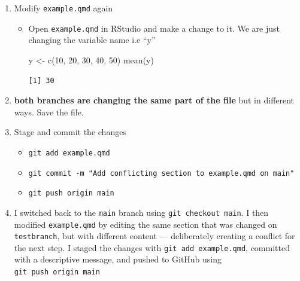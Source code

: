 \documentclass[
  letterpaper,
  DIV=11,
  numbers=noendperiod]{scrartcl}
\newenvironment{Shaded}{\begin{snugshade}}{\end{snugshade}}
\newcommand{\DecValTok}[1]{\textcolor[rgb]{0.68,0.00,0.00}{#1}}
\newcommand{\FunctionTok}[1]{\textcolor[rgb]{0.28,0.35,0.67}{#1}}
\newcommand{\NormalTok}[1]{\textcolor[rgb]{0.00,0.23,0.31}{#1}}
\newcommand{\OtherTok}[1]{\textcolor[rgb]{0.00,0.23,0.31}{#1}}
\begin{document}
\begin{enumerate}
\def\labelenumi{\arabic{enumi}.}
\item
  Modify \texttt{example.qmd} again

  \begin{itemize}
  \item
    Open \texttt{example.qmd} in RStudio and make a change to it. We are
    just changing the variable name i.e ``y''

\begin{Shaded}
\begin{Highlighting}[]
\NormalTok{y }\OtherTok{\textless{}{-}} \FunctionTok{c}\NormalTok{(}\DecValTok{10}\NormalTok{, }\DecValTok{20}\NormalTok{, }\DecValTok{30}\NormalTok{, }\DecValTok{40}\NormalTok{, }\DecValTok{50}\NormalTok{)}
\FunctionTok{mean}\NormalTok{(y)}
\end{Highlighting}
\end{Shaded}

\begin{verbatim}
[1] 30
\end{verbatim}
  \end{itemize}
\item
  \textbf{both branches are changing the same part of the file} but in
  different ways. Save the file.
\item
  Stage and commit the changes

  \begin{itemize}
  \item
    \texttt{git\ add\ example.qmd}
  \item
    \texttt{git\ commit\ -m\ "Add\ conflicting\ section\ to\ example.qmd\ on\ main"}
  \item
    \texttt{git\ push\ origin\ main}
  \end{itemize}
\item
  I switched back to the \texttt{main} branch using
  \texttt{git\ checkout\ main}. I then modified \texttt{example.qmd} by
  editing the same section that was changed on \texttt{testbranch}, but
  with different content --- deliberately creating a conflict for the
  next step. I staged the changes with \texttt{git\ add\ example.qmd},
  committed with a descriptive message, and pushed to GitHub using
  \texttt{git\ push\ origin\ main}
\end{enumerate}
\end{document}
